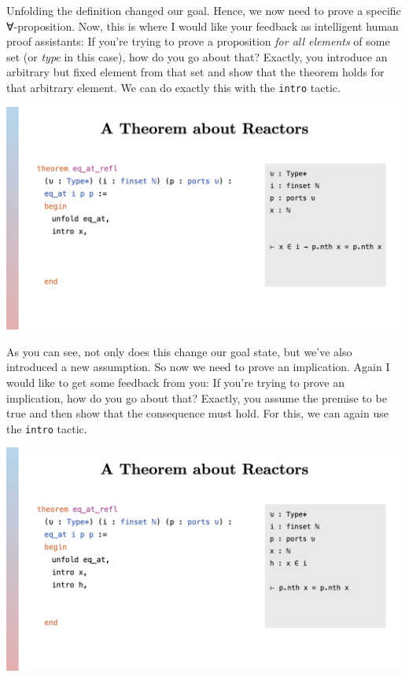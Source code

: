 \documentclass{article}
\begin{document}
Unfolding the definition changed our goal. Hence, we now need to prove a
specific ∀-proposition. Now, this is where I would like your feedback as
intelligent human proof assistants: If you're trying to prove a
proposition \emph{for all elements} of some set (or \emph{type} in this
case), how do you go about that? Exactly, you introduce an arbitrary but
fixed element from that set and show that the theorem holds for that
arbitrary element. We can do exactly this with the \lstinline{intro}
tactic.

\begin{center}
  \includegraphics[width=\columnwidth]{Slides/Slide 15.jpeg}
\end{center}

As you can see, not only does this change our goal state, but we've also
introduced a new assumption. So now we need to prove an implication.
Again I would like to get some feedback from you: If you're trying to
prove an implication, how do you go about that? Exactly, you assume the
premise to be true and then show that the consequence must hold. For
this, we can again use the \lstinline{intro} tactic.

\begin{center}
  \includegraphics[width=\columnwidth]{Slides/Slide 16.jpeg}
\end{center}
\end{document}
